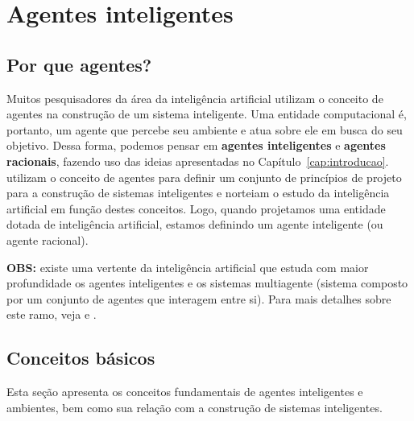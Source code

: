 \chapter{Agentes inteligentes}
\label{cap:agentes-inteligentes}


\section{Por que agentes?}

Muitos pesquisadores da área da inteligência artificial utilizam o conceito de agentes na construção de um sistema inteligente. Uma entidade computacional é, portanto, um agente que percebe seu ambiente e atua sobre ele em busca do seu objetivo. Dessa forma, podemos pensar em \textbf{agentes inteligentes} e \textbf{agentes racionais}, fazendo uso das ideias apresentadas no Capítulo~\ref{cap:introducao}. \citet{RusselAndNorvig2010} utilizam o conceito de agentes para definir um conjunto de princípios de projeto para a construção de sistemas inteligentes e norteiam o estudo da inteligência artificial em função destes conceitos. Logo, quando projetamos uma entidade dotada de inteligência artificial, estamos definindo um agente inteligente (ou agente racional).

\textbf{OBS:} existe uma vertente da inteligência artificial que estuda com maior profundidade os agentes inteligentes e os sistemas multiagente (sistema composto por um conjunto de agentes que interagem entre si). Para mais detalhes sobre este ramo, veja \citet{Weiss1999} e \citet{Wooldridge2009}.

\section{Conceitos básicos}

Esta seção apresenta os conceitos fundamentais de agentes inteligentes e ambientes, bem como sua relação com a construção de sistemas inteligentes.

